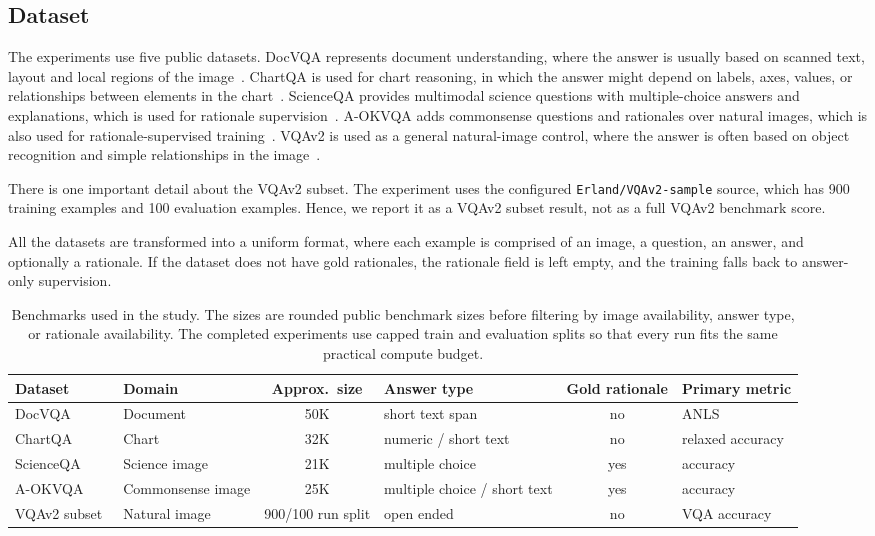 \documentclass[preprint,12pt]{elsarticle}
\begin{document}
\subsection{Dataset}
The experiments use five public datasets.
DocVQA represents document understanding, where the answer is usually based on scanned text, layout and local regions of the image~\cite{mathew2021docvqa}.
ChartQA is used for chart reasoning, in which the answer might depend on labels, axes, values, or relationships between elements in the chart~\cite{masry2022chartqa}.
ScienceQA provides multimodal science questions with multiple-choice answers and explanations, which is used for rationale supervision~\cite{lu2022scienceqa}.
A-OKVQA adds commonsense questions and rationales over natural images, which is also used for rationale-supervised training~\cite{schwenk2022aokvqa}.
VQAv2 is used as a general natural-image control, where the answer is often based on object recognition and simple relationships in the image~\cite{goyal2017vqav2}.

There is one important detail about the VQAv2 subset.
The experiment uses the configured \texttt{Erland/VQAv2-sample} source, which has 900 training examples and 100 evaluation examples.
Hence, we report it as a VQAv2 subset result, not as a full VQAv2 benchmark score.

All the datasets are transformed into a uniform format, where each example is comprised of an image, a question, an answer, and optionally a rationale.
If the dataset does not have gold rationales, the rationale field is left empty, and the training falls back to answer-only supervision.


\begin{table}[!ht]
\centering
\caption{Benchmarks used in the study. The sizes are rounded public benchmark sizes before filtering by image availability, answer type, or rationale availability. The completed experiments use capped train and evaluation splits so that every run fits the same practical compute budget.}
\label{tab:Datasets}
\begin{adjustbox}{max width=\textwidth}
\begin{tabular}{|l|l|c|l|c|l|}
\hline
\textbf{Dataset} & \textbf{Domain} & \textbf{Approx.\ size} & \textbf{Answer type} & \textbf{Gold rationale} & \textbf{Primary metric} \\ \hline
DocVQA~\cite{mathew2021docvqa} & Document & 50K & short text span & no & ANLS \\
ChartQA~\cite{masry2022chartqa} & Chart & 32K & numeric / short text & no & relaxed accuracy \\
ScienceQA~\cite{lu2022scienceqa} & Science image & 21K & multiple choice & yes & accuracy \\
A-OKVQA~\cite{schwenk2022aokvqa} & Commonsense image & 25K & multiple choice / short text & yes & accuracy \\
VQAv2 subset~\cite{goyal2017vqav2} & Natural image & 900/100 run split & open ended & no & VQA accuracy \\ \hline
\end{tabular}
\end{adjustbox}
\end{table}
\end{document}
